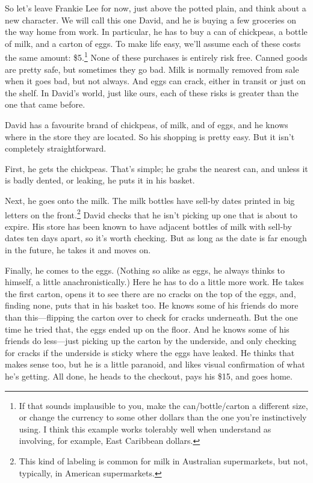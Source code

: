 \documentclass[
  10pt,
  letterpaper,
  twoside]{scrbook}
\begin{document}
So let's leave Frankie Lee for now, just above the potted plain, and
think about a new character. We will call this one David, and he is
buying a few groceries on the way home from work. In particular, he has
to buy a can of chickpeas, a bottle of milk, and a carton of eggs. To
make life easy, we'll assume each of these costs the same amount:
\$5.\footnote{If that sounds implausible to you, make the
  can/bottle/carton a different size, or change the currency to some
  other dollars than the one you're instinctively using. I think this
  example works tolerably well when understand as involving, for
  example, East Caribbean dollars.} None of these purchases is entirely
risk free. Canned goods are pretty safe, but sometimes they go bad. Milk
is normally removed from sale when it goes bad, but not always. And eggs
can crack, either in transit or just on the shelf. In David's world,
just like ours, each of these risks is greater than the one that came
before.

David has a favourite brand of chickpeas, of milk, and of eggs, and he
knows where in the store they are located. So his shopping is pretty
easy. But it isn't completely straightforward.

First, he gets the chickpeas. That's simple; he grabs the nearest can,
and unless it is badly dented, or leaking, he puts it in his basket.

Next, he goes onto the milk. The milk bottles have sell-by dates printed
in big letters on the front.\footnote{This kind of labeling is common
  for milk in Australian supermarkets, but not, typically, in American
  supermarkets.} David checks that he isn't picking up one that is about
to expire. His store has been known to have adjacent bottles of milk
with sell-by dates ten days apart, so it's worth checking. But as long
as the date is far enough in the future, he takes it and moves on.

Finally, he comes to the eggs. (Nothing so alike as eggs, he always
thinks to himself, a little anachronistically.) Here he has to do a
little more work. He takes the first carton, opens it to see there are
no cracks on the top of the eggs, and, finding none, puts that in his
basket too. He knows some of his friends do more than this---flipping
the carton over to check for cracks underneath. But the one time he
tried that, the eggs ended up on the floor. And he knows some of his
friends do less---just picking up the carton by the underside, and only
checking for cracks if the underside is sticky where the eggs have
leaked. He thinks that makes sense too, but he is a little paranoid, and
likes visual confirmation of what he's getting. All done, he heads to
the checkout, pays his \$15, and goes home.
\end{document}
